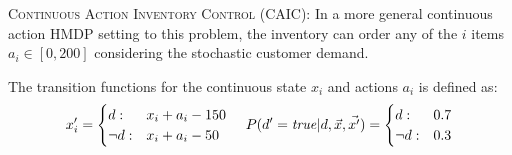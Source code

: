 \documentclass[twoside,11pt]{article}
\newcommand{\InventoryControl}{\textsc{Inventory Control }}
\begin{document}
\vspace{2mm}
\textsc{Continuous Action}  \InventoryControl (\textsc{CAIC}):
In a more general  continuous action HMDP setting to this problem, the inventory can order  any of the $i$ items $a_i \in [0,200]$ considering the stochastic customer demand. 

The transition functions for the continuous state $x_i$ and actions $a_i$ is defined as: 
{%
\vspace{-2mm}
\begin{align}
x'_i= \begin{cases}
d  : & x_i + a_i - 150 \\
\neg d : & x_i + a_i - 50    
\end{cases} 
\hspace{4mm}
 P(d'=\mathit{true}|d,\vec{x},\vec{x'})=  \begin{cases}
d     :& 0.7\\
\neg d : & 0.3	\\
\end{cases} \label{eq:trans_inv}
\end{align}
\vspace{-2mm}}
\end{document}
